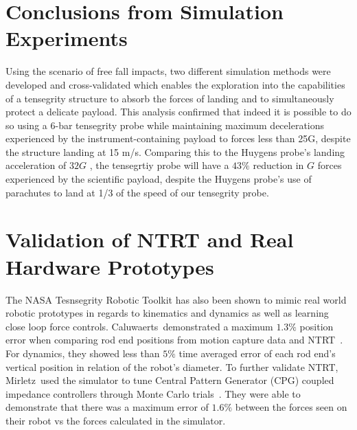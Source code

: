 \section{Conclusions from Simulation Experiments}
Using the scenario of free fall impacts, two different simulation methods were developed and cross-validated which enables the exploration into the capabilities of a tensegrity structure to absorb the forces of landing and to simultaneously protect a delicate payload.  This analysis confirmed that indeed it is possible to do so using a 6-bar tensegrity probe while maintaining maximum decelerations experienced by the instrument-containing payload to forces less than 25G, despite the structure landing at 15 m/s.   Comparing this to the Huygens probe's landing acceleration of \(32G\) \cite{lorenz1994huygens}, the tensegrtiy probe will have a \(43\% \) reduction in \(G\) forces experienced by the scientific payload, despite the Huygens probe's use of parachutes to land at 1/3 of the speed of our tensegrity probe.

\section{Validation of NTRT and Real Hardware Prototypes}
The NASA Tesnsegrity Robotic Toolkit has also been shown to mimic real world robotic prototypes in regards to kinematics and dynamics as well as learning close loop force controls.
Caluwaerts~\etal demonstrated a maximum \(1.3\%\) position error when comparing rod end positions from motion capture data and NTRT~\cite{caluwaerts2014design}. 
For dynamics, they showed less than \(5\%\) time averaged error of each rod end's vertical position in relation of the robot's diameter.
To further validate NTRT, Mirletz~\etal used the simulator to tune Central Pattern Generator (CPG) coupled impedance controllers through Monte Carlo trials~\cite{mirletz2015towards}. 
They were able to demonstrate that there was a maximum error of \(1.6\%\) between the forces seen on their robot vs the forces calculated in the simulator.
